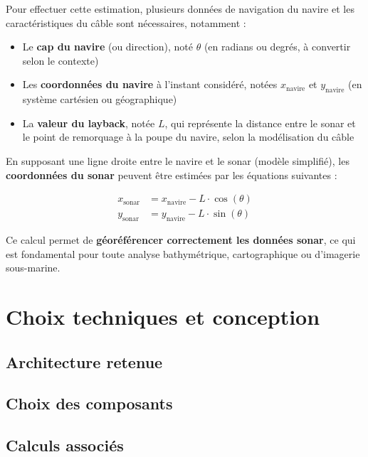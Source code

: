 \documentclass[12pt,a4paper]{report}
\begin{document}
Pour effectuer cette estimation, plusieurs données de navigation du navire et les caractéristiques du câble sont nécessaires, notamment :

\begin{itemize}
  \item Le \textbf{cap du navire} (ou direction), noté $\theta$ (en radians ou degrés, à convertir selon le contexte)
  \item Les \textbf{coordonnées du navire} à l’instant considéré, notées $x_{\text{navire}}$ et $y_{\text{navire}}$ (en système cartésien ou géographique)
  \item La \textbf{valeur du layback}, notée $L$, qui représente la distance entre le sonar et le point de remorquage à la poupe du navire, selon la modélisation du câble
\end{itemize}

En supposant une ligne droite entre le navire et le sonar (modèle simplifié), les \textbf{coordonnées du sonar} peuvent être estimées par les équations suivantes :

\begin{align*}
x_{\text{sonar}} &= x_{\text{navire}} - L \cdot \cos(\theta) \\
y_{\text{sonar}} &= y_{\text{navire}} - L \cdot \sin(\theta)
\end{align*}


Ce calcul permet de \textbf{géoréférencer correctement les données sonar}, ce qui est fondamental pour toute analyse bathymétrique, cartographique ou d'imagerie sous-marine.

\newpage


\section{Choix techniques et conception}

\subsection{Architecture retenue}
\subsection{Choix des composants}
\subsection{Calculs associés}
\end{document}
